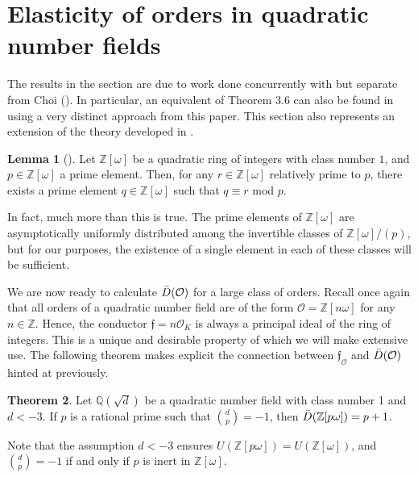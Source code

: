 \documentclass{amsart}
\theoremstyle{definition}
\newtheorem{lem}{Lemma}[section]
\newtheorem{thm}[lem]{Theorem}
\newcommand{\MO}{\mathcal{O}}
\newcommand{\bbz}{\mathbb{Z}}
\newcommand{\bbq}{\mathbb{Q}}
\numberwithin{equation}{section}
\begin{document}
\section{Elasticity of orders in quadratic number fields}

The results in the section are due to work done concurrently with but separate from Choi (\cite{choi2024class}). In particular, an equivalent of Theorem 3.6 can also be found in \cite{choi2024class} using a very distinct approach from this paper. This section also represents an extension of the theory developed in \cite{Kettinger2024}.


\begin{lem}[\cite{sittinger2016quotients}]
    Let $\bbz[\omega]$ be a quadratic ring of integers with class number $1$, and $p \in \bbz[\omega]$ a prime element. Then, for any $r \in \bbz[\omega]$ relatively prime to $p$, there exists a prime element $q \in \bbz[\omega]$ such that $q \equiv r$ mod $p$.
\end{lem}

In fact, much more than this is true. The prime elements of $\bbz[\omega]$ are asymptotically uniformly distributed among the invertible classes of $\bbz[\omega]/(p)$, but for our purposes, the existence of a single element in each of these classes will be sufficient. 

We are now ready to calculate $\Bar{D}(\MO)$ for a large class of orders. Recall once again that all orders of a quadratic number field are of the form $\MO = \bbz[n \omega]$ for any $n \in \bbz$. Hence, the conductor $\mathfrak{f} = n\MO_K$ is always a principal ideal of the ring of integers. This is a unique and desirable property of which we will make extensive use. The following theorem makes explicit the connection between $\mathfrak{f}_\MO$ and $\Bar{D}(\MO)$ hinted at previously. 

\begin{thm}
    Let $\bbq(\sqrt{d})$ be a quadratic number field with class number 1 and $d < -3$. If $p$ is a rational prime such that $\binom{d}{p} = -1$, then $\Bar{D}(\bbz[p\omega]) = p + 1$. 
\end{thm}

Note that the assumption $d < -3$ ensures $U(\bbz[p\omega]) = U(\bbz[\omega])$, and $\binom{d}{p} = -1$ if and only if $p$ is inert in $\bbz[\omega]$. 
\end{document}
